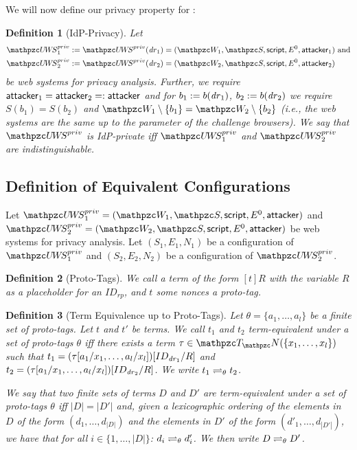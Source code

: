 \documentclass[letterpaper,onecolumn,10pt]{article}
\newtheorem{definition}{Definition}
\begin{document}
We will now define our privacy property for \uppresso:

\begin{definition}[IdP-Privacy]\label{def:idp-privacy}
  Let 
  \begin{align*}
    \uppressoprivwebsystem_1 := \uppressoprivwebsystem(\mi{dr}_1) =
    (\bidsystem_1, \scriptset, \mathsf{script}, E^0, \fAP{attacker}_1)&\text{ and}\\
    \uppressoprivwebsystem_2 := \uppressoprivwebsystem(\mi{dr}_2) =
    (\bidsystem_2, \scriptset, \mathsf{script}, E^0, \fAP{attacker}_2)&
  \end{align*}
  be \uppresso web systems for privacy analysis.  Further, we require
  $\mathsf{attacker}_1 = \mathsf{attacker}_2 =: \mathsf{attacker}$ and for $b_1
  := b(\mathit{dr}_1)$, $b_2 := b(\mathit{dr}_2)$ we require $S(b_1) = S(b_2)$
  and $\bidsystem_1 \setminus \{b_1\} = \bidsystem_2 \setminus
  \{b_2\}$ (i.e., the web systems are the same up to the parameter of
  the challenge browsers).  We say that $\uppressoprivwebsystem$ is
  \emph{IdP-private} iff $\uppressoprivwebsystem_1$ and
  $\uppressoprivwebsystem_2$ are indistinguishable.
\end{definition}

\subsection{Definition of Equivalent Configurations}\label{app:defin-equiv-stat}

Let $\uppressoprivwebsystem_1 = (\bidsystem_1, \scriptset, \mathsf{script}, E^0, \fAP{attacker})$ 
and $\uppressoprivwebsystem_2 = (\bidsystem_2, \scriptset, \mathsf{script}, E^0, \fAP{attacker})$ 
be \uppresso web systems for privacy analysis. Let $(S_1,E_1,N_1)$ 
be a configuration of $\uppressoprivwebsystem_1$ and $(S_2,E_2,N_2)$ 
be a configuration of $\uppressoprivwebsystem_2$.

\begin{definition}[Proto-Tags]
  We call a term of the form $[t]R$ with the variable
  $R$ as a placeholder for an $ID_{rp}$, and $t$ some nonces a
  \emph{proto-tag}.
\end{definition}

\begin{definition}[Term Equivalence up to Proto-Tags]
  Let $\theta = \{a_1, \ldots, a_l \}$ be a finite set of proto-tags.
  Let $t$ and $t'$ be terms. We call $t_1$ and $t_2$
  \emph{term-equivalent under a set of proto-tags $\theta$} iff there
  exists a term $\tau \in \terms(\{x_1,\dots,x_l\})$ such that
  $t_1 = (\tau [ a_1 / x_1 , \dots , a_l / x_l ])[ ID_{\mathit{dr}_1} / R ]$ and
  $t_2 = (\tau [ a_1 / x_1 , \dots , a_l / x_l ])[ ID_{\mathit{dr}_2} / R ]$.
  We write $t_1 \rightleftharpoons_{\theta} t_2$.

  We say that two finite sets of terms $D$ and $D'$ are
  \emph{term-equivalent under a set of proto-tags $\theta$} iff
  $|D| = |D'|$ and, given a lexicographic ordering of the elements in
  $D$ of the form $(d_1,\dots,d_{|D|})$ and the elements in $D'$ of
  the form $(d'_1,\dots,d_{|D'|})$, we have that for all
  $i \in \{1,\dots,|D|\}$: $d_i \rightleftharpoons_{\theta} d'_i$. We then
  write $D \rightleftharpoons_{\theta} D'$.
\end{definition}
\end{document}
